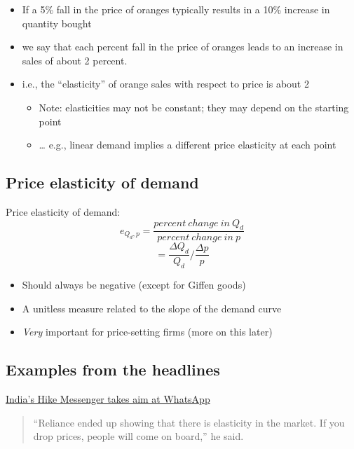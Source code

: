\documentclass[]{article}
\providecommand{\tightlist}{%
  \setlength{\itemsep}{0pt}\setlength{\parskip}{0pt}}
\begin{document}
\begin{itemize}
\tightlist
\item
  If a 5\% fall in the price of oranges typically results in a 10\% increase in quantity bought
\item
  we say that each percent fall in the price of oranges leads to an increase in sales of about 2 percent.
\item
  i.e., the ``elasticity'' of orange sales with respect to price is about 2

  \begin{itemize}
  \tightlist
  \item
    Note: elasticities may not be constant; they may depend on the starting point
  \item
    \ldots{} e.g., linear demand implies a different price elasticity at each point
  \end{itemize}
\end{itemize}

\hypertarget{price-elasticity-of-demand}{%
\subsection{Price elasticity of demand}\label{price-elasticity-of-demand}}

Price elasticity of demand:
\[e_{Q_d,p} = \frac{percent \ change \ in \ Q_d}{percent \ change \ in \ p} \]
\[  = \frac{\Delta Q_d}{Q_d}/\frac{\Delta p}{p}\]

\begin{itemize}
\tightlist
\item
  Should always be negative (except for Giffen goods)
\item
  A unitless measure related to the slope of the demand curve
\item
  \emph{Very} important for price-setting firms (more on this later)
\end{itemize}

\hypertarget{examples-from-the-headlines}{%
\subsection{Examples from the headlines}\label{examples-from-the-headlines}}

\href{https://www.ft.com/content/2665c794-76a0-11e6-b60a-de4532d5ea35}{India's Hike Messenger takes aim at WhatsApp}

\begin{quote}
``Reliance ended up showing that there is elasticity in the market. If you drop prices, people will come on board,'' he said.
\end{quote}
\end{document}
